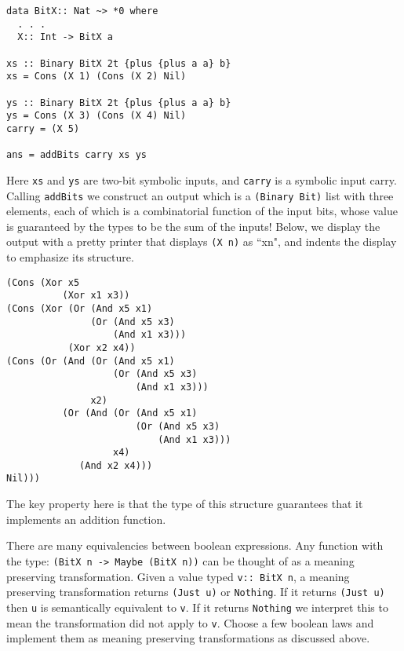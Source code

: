 \documentclass[11pt,twoside,A4]{llncs}
\begin{document}
{\small
\begin{verbatim}
data BitX:: Nat ~> *0 where
  . . .
  X:: Int -> BitX a
  
xs :: Binary BitX 2t {plus {plus a a} b}
xs = Cons (X 1) (Cons (X 2) Nil)  

ys :: Binary BitX 2t {plus {plus a a} b}
ys = Cons (X 3) (Cons (X 4) Nil)
carry = (X 5)

ans = addBits carry xs ys  
\end{verbatim}}
Here \verb+xs+ and \verb+ys+ are two-bit symbolic inputs, and \verb+carry+ is a symbolic
input carry. Calling \verb+addBits+ we construct an output which is a
\verb+(Binary Bit)+ list with three elements, each of which is a combinatorial
function of the input bits, whose value is guaranteed by the
types to be the sum of the inputs! Below, we display the output with a pretty
printer that displays \verb+(X n)+ as ``xn", and indents the display
to emphasize its structure.

{\small
\begin{verbatim}
(Cons (Xor x5
          (Xor x1 x3))
(Cons (Xor (Or (And x5 x1)
               (Or (And x5 x3)
                   (And x1 x3)))
           (Xor x2 x4))
(Cons (Or (And (Or (And x5 x1)
                   (Or (And x5 x3)
                       (And x1 x3)))
               x2)
          (Or (And (Or (And x5 x1)
                       (Or (And x5 x3)
                           (And x1 x3)))
                   x4)
             (And x2 x4)))
Nil)))             
\end{verbatim}}

The key property here is that the type of this structure guarantees
that it implements an addition function.

\begin{exercise}
There are many equivalencies between boolean expressions. Any
function with the type: {\tt  (BitX n -> Maybe (BitX n))} can be thought of
as a meaning preserving transformation. Given a value typed {\tt v:: BitX n},
a meaning preserving transformation returns {\tt (Just u)} or {\tt Nothing}. If it returns {\tt (Just u)}
then {\tt u} is semantically equivalent to {\tt v}. If it returns {\tt Nothing}
we interpret this to mean the transformation did not apply to {\tt v}.
Choose a few boolean laws and implement them as meaning preserving transformations
as discussed above.
\end{exercise}
\end{document}

